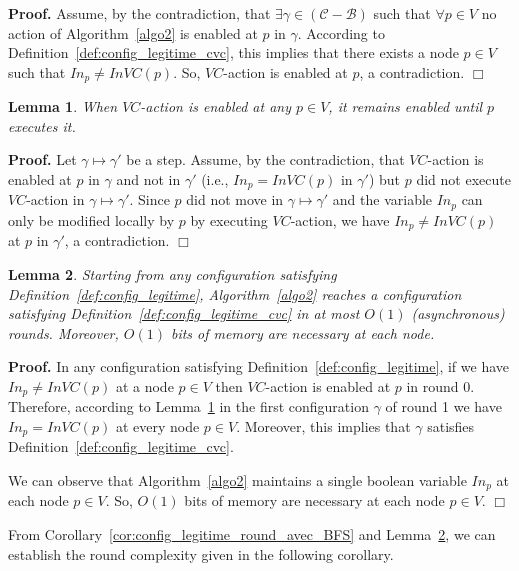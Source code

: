 \documentclass[11pt,letterpaper,onecolumn]{article}
\newtheorem{lemma}{Lemma}
\newenvironment{proof}{\noindent \begin{rm}{\textbf{Proof.} }}{\hspace*{\fill}$\Box$\par\end{rm} \vspace{.3cm}}
\begin{document}
\begin{proof}
Assume, by the contradiction, that $\exists \gamma \in (\mathcal{C}-\mathcal{B})$ such that $\forall p \in V$ no action of Algorithm~\ref{algo2} is enabled at $p$ in $\gamma$. According to Definition~\ref{def:config_legitime_cvc}, this implies that there exists a node $p \in V$ such that $In_p \neq InVC(p)$. So, $VC$-action is enabled at $p$, a contradiction.
\end{proof}

\begin{lemma}
\label{lem:VC-action}
When $VC$-action is enabled at any $p \in V$, it remains enabled until $p$ executes it.
\end{lemma}

\begin{proof}
Let $\gamma \mapsto \gamma'$ be a step. Assume, by the contradiction, that $VC$-action is enabled at $p$ in $\gamma$ and not in $\gamma'$ (i.e., $In_p=InVC(p)$ in $\gamma'$) but $p$ did not execute $VC$-action in $\gamma \mapsto \gamma'$. Since $p$ did not move in $\gamma \mapsto \gamma'$ and the variable $In_p$ can only be modified locally by $p$ by executing $VC$-action, we have $In_p \neq InVC(p)$ at $p$ in $\gamma'$, a contradiction.
\end{proof}

\begin{lemma}
\label{lem:config_legitime_cvc_round}
Starting from any configuration satisfying Definition~\ref{def:config_legitime}, Algorithm~\ref{algo2} reaches a configuration satisfying Definition~\ref{def:config_legitime_cvc} in at most $O(1)$ (asynchronous) rounds. Moreover, $O(1)$ bits of memory are necessary at each node.
\end{lemma}

\begin{proof}
In any configuration satisfying Definition~\ref{def:config_legitime}, if we have $In_p \neq InVC(p)$ at a node $p \in V$ then $VC$-action is enabled at $p$ in round 0. Therefore, according to Lemma~\ref{lem:VC-action} in the first configuration $\gamma$ of round 1 we have $In_p=InVC(p)$ at every node $p \in V$. Moreover, this implies that $\gamma$ satisfies Definition~\ref{def:config_legitime_cvc}.

We can observe that Algorithm~\ref{algo2} maintains a single boolean variable $In_p$ at each node $p \in V$. So, $O(1)$ bits of memory are necessary at each node $p \in V$.
\end{proof}

From Corollary~\ref{cor:config_legitime_round_avec_BFS} and Lemma~\ref{lem:config_legitime_cvc_round}, we can establish the round complexity given in the following corollary.
\end{document}

